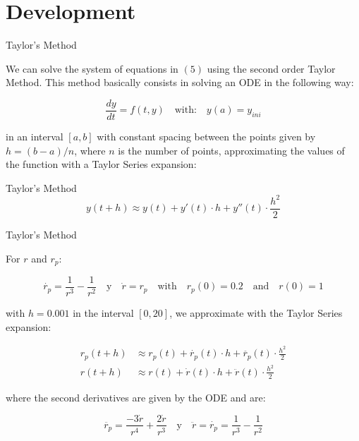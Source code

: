\documentclass[hyperref={pdfpagelabels=false}]{beamer}
\begin{document}
\section{Development} 
\begin{frame}{Taylor's Method} 

We can solve the system of equations in $(5)$ using the second order Taylor Method. This method basically consists in solving an ODE in the following way:

\begin{equation}
\frac{dy}{dt}= f(t,y) \quad \text{with:} \quad y(a)= y_{ini}
\end{equation}

in an interval $[a,b]$ with constant spacing between the points given by $h=(b-a)/n$, where $n$ is the number of points, approximating the values of the function with a Taylor Series expansion:

\begin{block}{Taylor's Method}
\begin{equation}
y(t+h) \approx y(t) + y'(t)\cdot h + y''(t) \cdot \frac{h^2}{2}
\end{equation}
\end{block}






\end{frame}
\begin{frame}{Taylor's Method}

\begin{block}{For $r$ and $r_{p}$:}

\begin{equation}
\dot{r_{p}} =\frac{1}{r^3}-\frac{1}{r^2} \quad \text{y} \quad 
  \dot{r} = r_{p} \quad \text{with} \quad r_{p}(0)=0.2 \quad \text{and} \quad r(0)=1 
\end{equation}
\end{block}

with $h=0.001$ in the interval $[0,20]$, we approximate with the Taylor Series expansion:

\begin{align*}
r_{p}(t+h) &\approx r_{p}(t) + \dot{r_{p}}(t) \cdot h + \ddot{r_{p}}(t) \cdot \frac{h^2}{2} \\
r(t+h) &\approx r(t) + \dot{r}(t) \cdot h + \ddot{r}(t) \cdot \frac{h^2}{2}
\end{align*}

where the second derivatives are given by the ODE and are:

\begin{equation*}
\ddot{r_{p}} = \frac{-3\dot{r}}{r^4}+\frac{2\dot{r}}{r^3} \quad \text{y} \quad \ddot{r} = \dot{r_{p}}= \frac{1}{r^3}-\frac{1}{r^2}
\end{equation*}



    
\end{frame}
\end{document}
